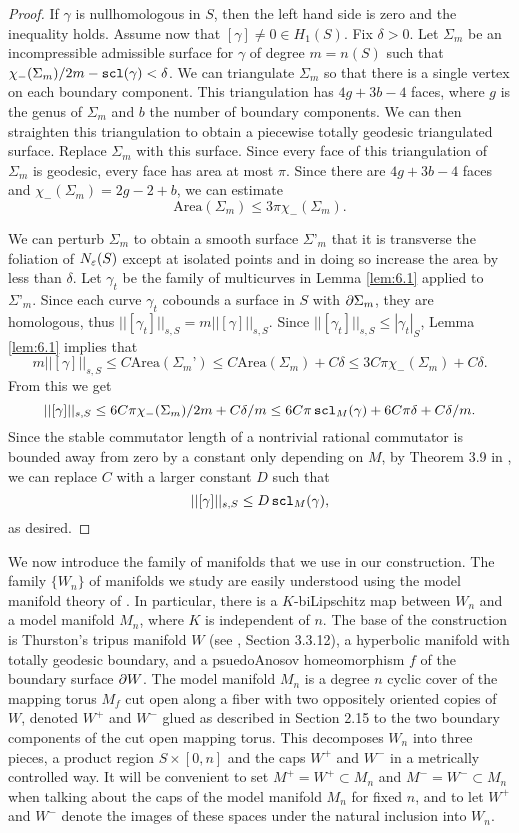  \begin{proof} If $\gamma$ is nullhomologous in $S$, then the left hand side is zero and the inequality holds. Assume now that $[\gamma]\neq 0\in H_1(S)$. Fix $\delta>0$. Let $\Sigma_m$ be an incompressible admissible surface for $\gamma$ of degree $m = n(S)$ such that $\chi_-(\Sigma_m)/2m -\operatorname{{\tt{scl}}}(\gamma) < \delta$. We can triangulate $\Sigma_m$ so that there is a single vertex on each boundary component. This triangulation has $4g +3b - 4$ faces, where $g$ is the genus of $\Sigma_m$ and $b$ the number of boundary components. We can then straighten this triangulation to obtain a piecewise totally geodesic triangulated surface. Replace $\Sigma_m$ with this surface. Since every face of this triangulation of $\Sigma_m$ is geodesic, every face has area at most $\pi$. Since there are $4g+3b - 4$ faces and $\chi_-(\Sigma_m) = 2g-2 + b$, we can estimate  $$\text{Area}(\Sigma_m) \leq 3\pi\chi_-(\Sigma_m).$$

We can perturb $\Sigma_m$ to obtain a smooth surface $\Sigma’_m$ that it is transverse the foliation of $N_\varepsilon(S)$ except at isolated points and in doing so increase the area by less than $\delta$. Let $\gamma_t$ be the family of multicurves in Lemma \ref{lem:6.1}  applied to $\Sigma’_m$. Since each curve $\gamma_t$ cobounds a surface in $S$ with $\partial \Sigma_m$, they are homologous, thus $||[\gamma_t]||_{s,S} = m||[\gamma]||_{s,S}$. Since $||[\gamma_t]||_{s,S}\leq |\gamma_t|_S$,
Lemma \ref{lem:6.1}  implies that $$m||[\gamma]||_{s,S}\leq C\text{Area}(\Sigma_m’) \leq C \text{Area}(\Sigma_m) + C\delta \leq 3C\pi\chi_-(\Sigma_m) + C\delta.$$
From this we get  $$||[\gamma]||_{s,S}\leq 6C\pi\chi_-(\Sigma_m)/2m + C\delta/m\leq 6C\pi\operatorname{{\tt{scl}}}_M(\gamma) + 6C\pi\delta +C\delta/m.$$
Since the stable commutator length of a nontrivial rational commutator is bounded away from zero by a constant only depending on $M$, by Theorem 3.9 in \cite{Calegari}, we can replace $C$ with a larger constant $D$ such that $$||[\gamma]||_{s,S}\leq D\operatorname{{\tt{scl}}}_M(\gamma),$$ as desired. \end{proof}

 We now introduce the family of manifolds that we use in our construction. The family $\{W_n\}$ of manifolds we study are easily understood using the model manifold theory of \cite{BMNS}. In particular, there is a $K$-biLipschitz map between $W_n$ and a model manifold $M_n$, where $K$ is independent of $n$. The base of the construction is Thurston’s tripus manifold $W$ (see \cite{thurstonbook}, Section 3.3.12), a hyperbolic manifold with totally geodesic boundary, and a psuedoAnosov homeomorphism $f$ of the boundary surface $\partial W$. The model manifold $ M_n$ is a degree $n$ cyclic cover of the mapping torus $M_{f}$ cut open along a fiber with two oppositely oriented copies of $W$, denoted $W^+$ and $W^-$ glued as described in \cite{BMNS} Section 2.15 to the two boundary components of the cut open mapping torus. This decomposes $W_n$ into three pieces, a product region $S\times [0, n]$ and the caps $W^+$ and $W^-$ in a metrically controlled way. It will be convenient to set $M^+ = W^+\subset M_n$ and $M^- = W^-\subset M_n$ when talking about the caps of the model manifold $M_n$ for fixed $n$, and to let $W^+$ and $W^-$ denote the images of these spaces under the natural inclusion into $W_n$.

